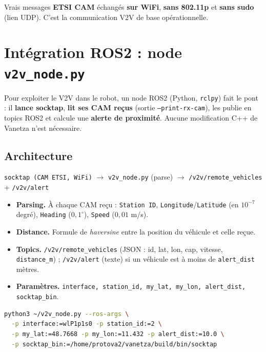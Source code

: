 \documentclass[a4paper,11pt]{article}
\begin{document}
\begin{tcolorbox}[colback=lightgreen,colframe=success,title=Points clés]
Vrais messages \textbf{ETSI CAM} échangés \textbf{sur WiFi}, \textbf{sans 802.11p}
et \textbf{sans sudo} (lien UDP). C'est la communication V2V de base
opérationnelle.
\end{tcolorbox}

\section{Intégration ROS2 : node \texttt{v2v\_node.py}}
Pour exploiter le V2V dans le robot, un node ROS2 (Python, \texttt{rclpy}) fait le
pont : il \textbf{lance socktap}, \textbf{lit ses CAM reçus} (sortie
\texttt{--print-rx-cam}), les publie en topics ROS2 et calcule une \textbf{alerte
de proximité}. Aucune modification C++ de Vanetza n'est nécessaire.

\subsection{Architecture}
\begin{center}
\texttt{socktap (CAM ETSI, WiFi)} $\rightarrow$ \texttt{v2v\_node.py} (parse)
$\rightarrow$ \texttt{/v2v/remote\_vehicles} + \texttt{/v2v/alert}
\end{center}
\begin{itemize}[leftmargin=1.4em]
  \item \textbf{Parsing.} À chaque CAM reçu : \texttt{Station ID},
        \texttt{Longitude}/\texttt{Latitude} (en $10^{-7}$ degré),
        \texttt{Heading} ($0{,}1^\circ$), \texttt{Speed} ($0{,}01$ m/s).
  \item \textbf{Distance.} Formule de \emph{haversine} entre la position du
        véhicule et celle reçue.
  \item \textbf{Topics.} \texttt{/v2v/remote\_vehicles} (JSON : id, lat, lon, cap,
        vitesse, \texttt{distance\_m}) ; \texttt{/v2v/alert} (texte) si un
        véhicule est à moins de \texttt{alert\_dist} mètres.
  \item \textbf{Paramètres.} \texttt{interface, station\_id, my\_lat, my\_lon,
        alert\_dist, socktap\_bin}.
\end{itemize}
\begin{lstlisting}[language=bash]
python3 ~/v2v_node.py --ros-args \
  -p interface:=wlP1p1s0 -p station_id:=2 \
  -p my_lat:=48.7668 -p my_lon:=11.432 -p alert_dist:=10.0 \
  -p socktap_bin:=/home/protova2/vanetza/build/bin/socktap
\end{lstlisting}
\end{document}
